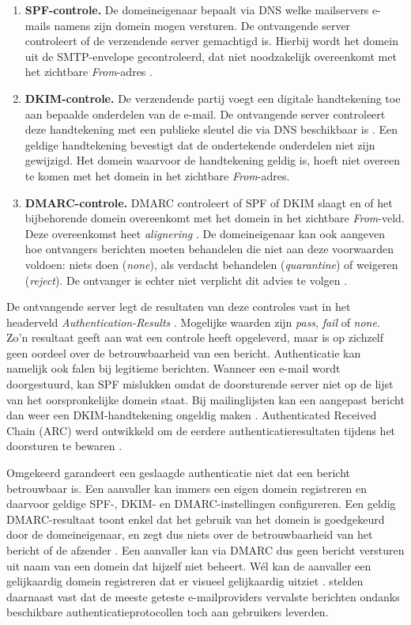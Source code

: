\begin{enumerate}
    \item \textbf{SPF-controle.} De domeineigenaar bepaalt via DNS welke mailservers e-mails namens zijn domein mogen versturen. De ontvangende server controleert of de verzendende server gemachtigd is. Hierbij wordt het domein uit de SMTP-envelope gecontroleerd, dat niet noodzakelijk overeenkomt met het zichtbare \emph{From}-adres \autocite{Kitterman2014}.
    \item \textbf{DKIM-controle.} De verzendende partij voegt een digitale handtekening toe aan bepaalde onderdelen van de e-mail. De ontvangende server controleert deze handtekening met een publieke sleutel die via DNS beschikbaar is \autocite{Crocker2011}. Een geldige handtekening bevestigt dat de ondertekende onderdelen niet zijn gewijzigd. Het domein waarvoor de handtekening geldig is, hoeft niet overeen te komen met het domein in het zichtbare \emph{From}-adres.
    \item \textbf{DMARC-controle.} DMARC controleert of SPF of DKIM slaagt en of het bijbehorende domein overeenkomt met het domein in het zichtbare \emph{From}-veld. Deze overeenkomst heet \emph{alignering} \autocite{Herr2026}. De domeineigenaar kan ook aangeven hoe ontvangers berichten moeten behandelen die niet aan deze voorwaarden voldoen: niets doen (\emph{none}), als verdacht behandelen (\emph{quarantine}) of weigeren (\emph{reject}). De ontvanger is echter niet verplicht dit advies te volgen \autocite{Herr2026}.
\end{enumerate}

De ontvangende server legt de resultaten van deze controles vast in het headerveld \emph{Authen\-tication-Results} \autocite{Kucherawy2019}. Mogelijke waarden zijn \emph{pass}, \emph{fail} of \emph{none}. Zo'n resultaat geeft aan wat een controle heeft opgeleverd, maar is op zichzelf geen oordeel over de betrouwbaarheid van een bericht.
Authenticatie kan namelijk ook falen bij legitieme berichten. Wanneer een e-mail wordt doorgestuurd, kan SPF mislukken omdat de doorsturende server niet op de lijst van het oorspronkelijke domein staat. Bij mailinglijsten kan een aangepast bericht dan weer een DKIM-handtekening ongeldig maken \autocite{Herr2026}. Authenticated Received Chain (ARC) werd ontwikkeld om de eerdere authenticatieresultaten tijdens het doorsturen te bewaren \autocite{Andersen2019}.

Omgekeerd garandeert een geslaagde authenticatie niet dat een bericht betrouwbaar is. Een aanvaller kan immers een eigen domein registreren en daarvoor geldige SPF-, DKIM- en DMARC-in\-stellingen configureren. Een geldig DMARC-resul\-taat toont enkel dat het gebruik van het domein is goedgekeurd door de domeineigenaar, en zegt dus niets over de betrouwbaarheid van het bericht of de afzender \autocite{Herr2026}.
Een aanvaller kan via DMARC dus geen bericht versturen uit naam van een domein dat hijzelf niet beheert. Wél kan de aanvaller een gelijkaardig domein registreren dat er visueel gelijkaardig uitziet \autocite{Herr2026}. \textcite{Hu2018} stelden daarnaast vast dat de meeste geteste e-mailproviders vervalste berichten ondanks beschikbare authenticatieprotocollen toch aan gebruikers leverden.

